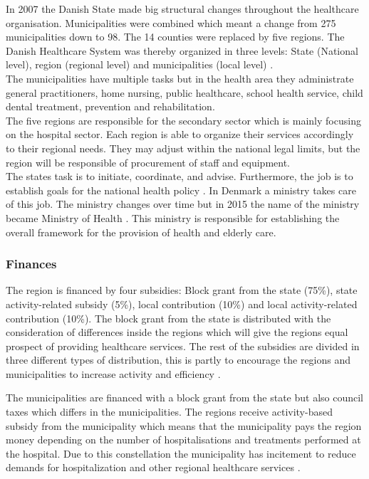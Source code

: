 In 2007 the Danish State made big structural changes throughout the healthcare organisation. Municipalities were combined which meant a change from 275 municipalities down to 98. The 14 counties were replaced by five regions. The Danish Healthcare System was thereby organized in three levels: State (National level), region (regional level) and municipalities (local level) \cite{indenrigs, Healthcareindk2}.\\

The municipalities have multiple tasks but in the health area they administrate general practitioners, home nursing, public healthcare, school health service, child dental treatment, prevention and rehabilitation\cite{sundhedsministeriet}. \\

The five regions are responsible for the secondary sector which is mainly focusing on the hospital sector. Each region is able to organize their services accordingly to their regional needs. They may adjust within the national legal limits, but the region will be responsible of procurement of staff and equipment.\\

The states task is to initiate, coordinate, and advise. Furthermore, the job is to establish goals for the national health policy \cite{sundhedsministeriet}. In Denmark a ministry takes care of this job. The ministry changes over time but in 2015 the name of the ministry became Ministry of Health \cite{ministryofhealth}. This ministry is responsible for establishing the overall framework for the provision of health and elderly care.


\subsubsection{Finances}

The region is financed by four subsidies: Block grant from the state (75\%), state activity-related subsidy (5\%), local contribution (10\%) and local activity-related contribution (10\%). The block grant from the state is distributed with the consideration of differences inside the regions which will give the regions equal prospect of providing healthcare services. The rest of the subsidies are divided in three different types of distribution, this is partly to encourage the regions and municipalities to increase activity and efficiency \cite{sundhedsministeriet}.

The municipalities are financed with a block grant from the state but also council taxes which differs in the municipalities. The regions receive activity-based subsidy from the municipality which means that the municipality pays the region money depending on the number of hospitalisations and treatments performed at the hospital. Due to this constellation the municipality has incitement to reduce demands for hospitalization and other regional healthcare services \cite{Healthcareindk2}.

